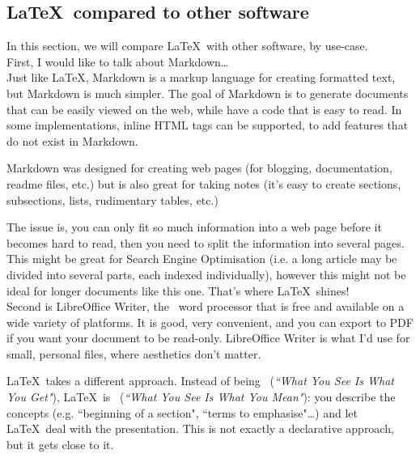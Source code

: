 \subsection{\LaTeX\ compared to other software}

In this section, we will compare \LaTeX\ with other software, by use-case. \\

First, I would like to talk about Markdown\dots \\
Just 
like \LaTeX, Markdown is a markup language for creating formatted text, but Markdown is much simpler. The goal of Markdown is to generate documents that can be easily viewed on the web, while have a code that is easy to read. In some implementations, inline HTML tags can be supported, to add features that do not exist in Markdown.

Markdown was designed for creating web pages (for blogging, documentation, readme files, etc.) but is also great for taking notes (it's easy to create sections, subsections, lists, rudimentary tables, etc.) 

The 
issue is, you can only fit so much information into a web page before it becomes hard to read, then you need to split the information into several pages. This might be great for Search Engine Optimisation (i.e. a long article may be divided into several parts, each indexed individually), however this might not be ideal for longer documents like this one. That's where \LaTeX\ shines! \\


Second 
is LibreOffice Writer, the \WYSIWYG\ word processor that is free and available on a wide variety of platforms. It is good, very convenient, and you can export to PDF if you want your document to be read-only. LibreOffice Writer is what I'd use for small, personal files, where aesthetics don't matter. 

\LaTeX\ takes a different approach. Instead of being \WYSIWYG\ (\emph{``What You See Is What You Get"}), \LaTeX\ is \WYSIWYM\ (\emph{``What You See Is What You \emph{Mean}"}): you describe the concepts (e.g. ``beginning of a section", ``terms to emphasise"\dots) and let \LaTeX\ deal with the presentation. This is not exactly a declarative approach, but it gets close to it. \\

